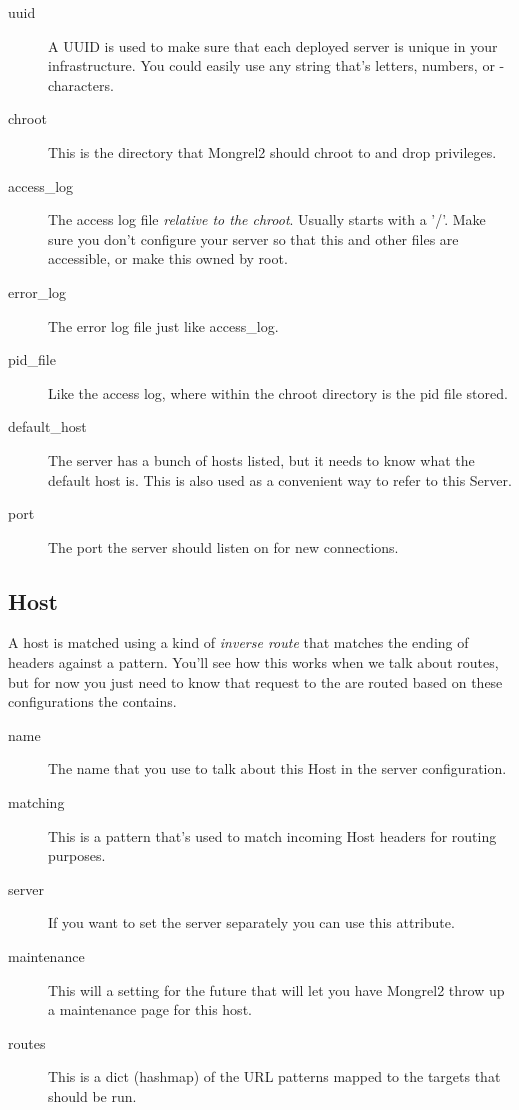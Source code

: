 \begin{description}
\item[uuid] A UUID is used to make sure that each deployed server is unique in your infrastructure.
    You could easily use any string that's letters, numbers, or - characters.
\item[chroot] This is the directory that Mongrel2 should chroot to and drop privileges.
\item[access\_log] The access log file \emph{relative to the chroot}.  Usually starts with a '/'.  Make sure
    you don't configure your server so that this and other files are accessible, or make this owned by root.
\item[error\_log] The error log file just like access\_log.
\item[pid\_file] Like the access log, where within the chroot directory is the pid file stored.
\item[default\_host] The server has a bunch of hosts listed, but it needs to know what the default host is.  This is also
    used as a convenient way to refer to this Server.
\item[port] The port the server should listen on for new connections.
\end{description}


\subsection{Host}

A host is matched using a kind of \emph{inverse route} that matches the ending of 
headers against a pattern.  You'll see how this works when we talk about routes, but for now
you just need to know that request to the  are routed based on these 
configurations the  contains.

\begin{description}
\item[name] The name that you use to talk about this Host in the server configuration.
\item[matching] This is a pattern that's used to match incoming Host headers for routing purposes.
\item[server] If you want to set the server separately you can use this attribute.
\item[maintenance] This will a setting for the future that will let you have Mongrel2 throw up a maintenance page
    for this host.
\item[routes] This is a dict (hashmap) of the URL patterns mapped to the targets that should be run.
\end{description}


